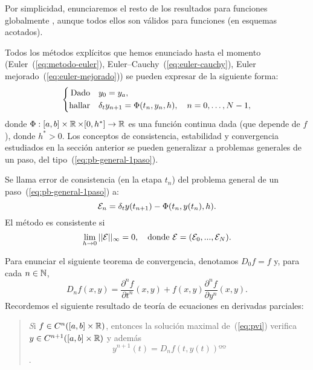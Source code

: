 Por simplicidad, enunciaremos  el resto de los resultados para
funciones globalmente \lipschitz, aunque todos ellos son válidos para
funciones \locLipschitz (en esquemas acotados).


\label{sec:metodos-de-taylor}
Todos los métodos explícitos que hemos enunciado hasta el momento
(Euler~(\ref{eq:metodo-euler}), Euler--Cauchy~(\ref{eq:euler-cauchy}),
Euler mejorado~(\ref{eq:euler-mejorado})) se pueden expresar de la
siguiente forma:
\begin{equation}
  \label{eq:pb-general-1paso} 
  \left\{
  \begin{aligned}
    \text{Dado}\quad &y_0 = {y_a},\\
    \text{hallar}\quad &\delta_t {y_{n+1}} = \Phi({t_n},{y_n}, h), \quad n=0,\dots,
    N-1,
  \end{aligned}
  \right.
\end{equation}
donde $\Phi:[a,b]\times \operatorname{{\mathbb R}} \times [0,h^*] \to \operatorname{{\mathbb R}}$ es una
función continua dada (que depende de $f$), donde $h^*>0$. Los
conceptos de consistencia, estabilidad y convergencia estudiados en la
sección anterior se pueden generalizar a problemas generales de un
paso, del tipo~(\ref{eq:pb-general-1paso}).

\begin{definition}
  Se llama error de consistencia (en la etapa $t_n$) del problema
  general de un paso~(\ref{eq:pb-general-1paso}) a:
  $${\cal E}_n=\delta_t y({t_{n+1}}) - \Phi({t_n},y({t_n}),h).$$
  El método es consistente si
  $$
  \lim_{h\to 0} ||{\cal E}||_\infty  = 0, \quad \text{donde } {\cal
    E}=({\cal E}_0,...,{\cal E}_N).
  $$
\end{definition}

\newcommand{\Dtotal}[2]{D_{#1}#2} Para enunciar el siguiente teorema
de convergencia, denotamos $D_0f = f$ y, para cada $n\in\operatorname{{\mathbb N}}$,
$$
\Dtotal n f(x,y) = \frac {\partial^n f}{\partial t^n}(x,y) + f(x,y)
\frac {\partial^n f}{\partial y^n} (x,y).
$$
Recordemos el siguiente resultado de teoría de ecuaciones en derivadas
parciales:
\begin{quotation}
  \emph Si $f\in C^n([a,b]\times\operatorname{{\mathbb R}})$, entonces la solución
  maximal de~(\ref{eq:pvi}) verifica $y\in
  C^{n+1}([a,b]\times\operatorname{{\mathbb R}})$ y además $$y^{n+1}(t)=\Dtotal n f(t,
  y(t))ºº$$.
\end{quotation}


